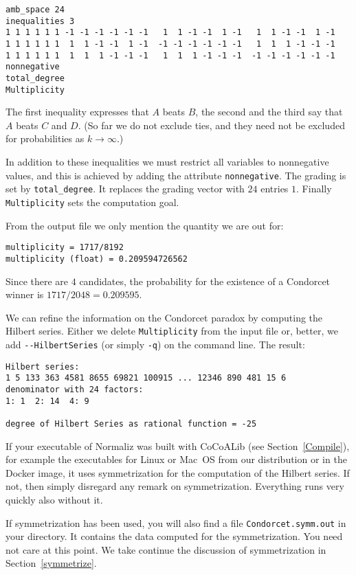 \documentclass[12pt,a4paper]{scrartcl}
\theoremstyle{definition}
\begin{document}
\begin{Verbatim}
amb_space 24
inequalities 3
1 1 1 1 1 1 -1 -1 -1 -1 -1 -1   1  1 -1 -1  1 -1   1  1 -1 -1  1 -1
1 1 1 1 1 1  1  1 -1 -1  1 -1  -1 -1 -1 -1 -1 -1   1  1  1 -1 -1 -1
1 1 1 1 1 1  1  1  1 -1 -1 -1   1  1  1 -1 -1 -1  -1 -1 -1 -1 -1 -1
nonnegative
total_degree
Multiplicity
\end{Verbatim}
The first inequality expresses that $A$ beats $B$, the second and the third say that $A$ beats $C$ and $D$. (So far we do not exclude ties, and they need not be excluded for probabilities as $k\to\infty$.)

In addition to these inequalities we must restrict all variables to nonnegative values, and this is achieved by adding the attribute \verb|nonnegative|. The grading is set by \verb|total_degree|. It replaces the grading vector with $24$ entries $1$. Finally \verb|Multiplicity| sets the computation goal.

From the output file we only mention the quantity we are out for:
\begin{Verbatim}
multiplicity = 1717/8192
multiplicity (float) = 0.209594726562
\end{Verbatim}
Since there are $4$ candidates, the probability for the existence of a Condorcet winner is $1717/2048=0.209595$.

We can refine the information on the Condorcet paradox by computing the Hilbert series. Either we delete \verb|Multiplicity| from the input file or, better, we add \verb|--HilbertSeries| (or simply \verb|-q|) on the command line. The result:
\begin{Verbatim}
Hilbert series:
1 5 133 363 4581 8655 69821 100915 ... 12346 890 481 15 6 
denominator with 24 factors:
1: 1  2: 14  4: 9

degree of Hilbert Series as rational function = -25
\end{Verbatim}

If your executable of Normaliz was built with CoCoALib (see Section~\ref{Compile}), for example the executables for Linux or Mac~OS from our distribution or in the Docker image, it uses symmetrization for the computation of the Hilbert series. If not, then simply disregard any remark on symmetrization. Everything runs very quickly also without it.

If symmetrization has been used, you will also find a file \verb|Condorcet.symm.out| in your directory. It contains the data computed for the symmetrization. You need not care at this point. We take continue the discussion of symmetrization in Section~\ref{symmetrize}.
\end{document}
